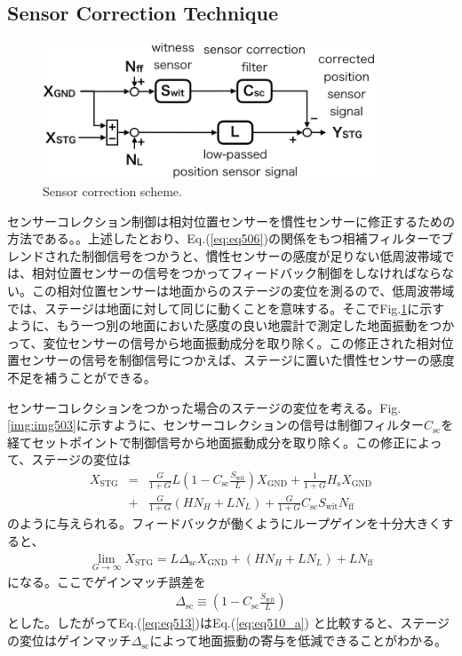 \subsection{Sensor Correction Technique}
\begin{figure}[h]
  \begin{center}   
    \includegraphics[width=10cm]{./img_chap5/img505.png}
    \caption{Sensor correction scheme.} \label{img:img505}
  \end{center}
\end{figure}
センサーコレクション制御は相対位置センサーを慣性センサーに修正するための方法である。\cite{hua2005low}。上述したとおり、Eq.(\ref{eq:eq506})の関係をもつ相補フィルターでブレンドされた制御信号をつかうと、慣性センサーの感度が足りない低周波帯域では、相対位置センサーの信号をつかってフィードバック制御をしなければならない。この相対位置センサーは地面からのステージの変位を測るので、低周波帯域では、ステージは地面に対して同じに動くことを意味する。そこでFig.\ref{img:img505}に示すように、もう一つ別の地面においた感度の良い地震計で測定した地面振動をつかって、変位センサーの信号から地面振動成分を取り除く。この修正された相対位置センサーの信号を制御信号につかえば、ステージに置いた慣性センサーの感度不足を補うことができる。

センサーコレクションをつかった場合のステージの変位を考える。Fig.\ref{img:img503}に示すように、センサーコレクションの信号は制御フィルター$C_{\mathrm{sc}}$を経てセットポイントで制御信号から地面振動成分を取り除く。この修正によって、ステージの変位は
\begin{eqnarray}\nonumber
  X_{\mathrm{STG}} &=&\frac{G}{1+G}L\left(1-C_{\mathrm{sc}}\frac{S_{\mathrm{wit}}}{L}\right) X_{\mathrm{GND}} + \frac{1}{1+G}H_{\mathrm{s}}X_{\mathrm{GND}}\\ 
  &+& \frac{G}{1+G}\left(HN_{H}+LN_{L}\right) + \frac{G}{1+G}C_{\mathrm{sc}}S_{\mathrm{wit}}N_{\mathrm{ff}} \label{eq:eq511}
\end{eqnarray}
のように与えられる。フィードバックが働くようにループゲインを十分大きくすると、
\begin{eqnarray}
  \lim_{G\to\infty} X_{\mathrm{STG}} = L\Delta_{\mathrm{sc}} X_{\mathrm{GND}} + \left(HN_{H}+LN_{L}\right) + {L}N_{\mathrm{ff}} \label{eq:eq513}
\end{eqnarray}
になる。ここでゲインマッチ誤差を
\begin{eqnarray}
  \Delta_{\mathrm{sc}} \equiv \left(1-C_{\mathrm{sc}}\frac{S_{\mathrm{wit}}}{L}\right) \label{eq:eq512}
\end{eqnarray}
とした。したがってEq.(\ref{eq:eq513})はEq.(\ref{eq:eq510_a}) と比較すると、ステージの変位はゲインマッチ$\Delta_{\mathrm{sc}}$によって地面振動の寄与を低減できることがわかる。

